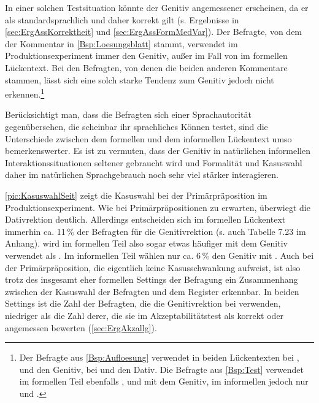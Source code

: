 \begin{sloppypar}
\noindent
In einer solchen Testsituation könnte der Genitiv angemessener erscheinen, da er als standardsprachlich und daher korrekt gilt (s. Ergebnisse in \autoref{sec:ErgAssKorrektheit} und \autoref{sec:ErgAssFormMedVar}). 
Der Befragte, von dem der Kommentar in \autoref{Bsp:Loesungsblatt} stammt, verwendet im Produktionsexperiment immer den Genitiv, außer im Fall von  im formellen Lückentext. 
Bei den Befragten, von denen die beiden anderen Kommentare stammen, lässt sich eine solch starke Tendenz zum Genitiv jedoch nicht erkennen.\footnote{Der Befragte aus \autoref{Bsp:Aufloesung} verwendet in beiden Lückentexten bei \wegen{}, \waehrend{} und \dank{} den Genitiv, bei \gegenueber{} und  den Dativ. Die Befragte aus \autoref{Bsp:Test} verwendet im formellen Teil ebenfalls \wegen{}, \waehrend{} und \dank{} mit dem Genitiv, im informellen jedoch nur \wegen{} und \waehrend{}.}
\end{sloppypar}

Berücksichtigt man, dass die Befragten sich einer Sprachautorität gegenübersehen, die scheinbar ihr sprachliches Können testet, sind die Unterschiede zwischen dem formellen und dem informellen Lückentext umso bemerkenswerter. 
Es ist zu vermuten, dass der Genitiv in natürlichen informellen Interaktionssituationen seltener gebraucht wird und Formalität und Kasuswahl daher im natürlichen Sprachgebrauch noch sehr viel stärker interagieren. 
\largerpage

\autoref{pic:KasuswahlSeit} zeigt die Kasuswahl bei der Primärpräposition  im Produktionsexperiment. 
Wie bei Primärpräpositionen zu erwarten, überwiegt die Dativrektion deutlich. 
Allerdings entscheiden sich im formellen Lückentext immerhin ca. 11\,\% der Befragten für die Genitivrektion (s. auch Tabelle 7.23 im Anhang). 
 wird im formellen Teil also sogar etwas häufiger mit dem Genitiv verwendet als \gegenueber. 
Im informellen Teil wählen nur ca. 6\,\% den Genitiv mit . 
Auch bei der Primärpräposition, die eigentlich keine Kasusschwankung aufweist, ist also trotz des insgesamt eher formellen Settings der Befragung ein Zusammenhang zwischen der Kasuswahl der Befragten und dem Register erkennbar. 
In beiden Settings ist die Zahl der Befragten, die die Genitivrektion bei  verwenden, niedriger als die Zahl derer, die sie im Akzeptabilitätstest als korrekt oder angemessen bewerten (\autoref{sec:ErgAkzallg}). 

